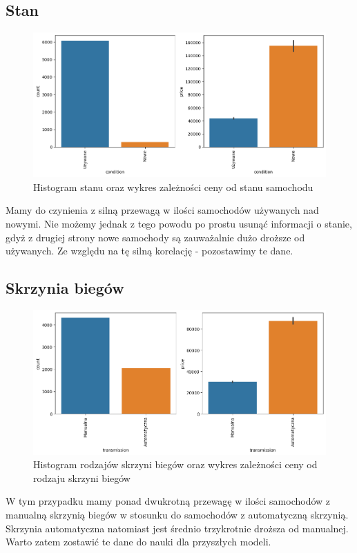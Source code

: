 \documentclass{article}
\begin{document}
\subsection{Stan}
\begin{figure}[H]
    \centering
    \includegraphics[width=1\linewidth]{images/stan.png}
    \caption{Histogram stanu oraz wykres zależności ceny od stanu samochodu}
    \label{plt:condition}
\end{figure}
Mamy do czynienia z silną przewagą w ilości samochodów używanych nad nowymi. Nie możemy jednak z tego powodu po prostu usunąć informacji o stanie, gdyż z drugiej strony nowe samochody są zauważalnie dużo droższe od używanych. Ze względu na tę silną korelację - pozostawimy te dane.

\subsection{Skrzynia biegów}
\begin{figure}[H]
    \centering
    \includegraphics[width=1\linewidth]{images/skrzynia_biegow.png}
    \caption{Histogram rodzajów skrzyni biegów oraz wykres zależności ceny od rodzaju skrzyni biegów}
    \label{plt:transmission}
\end{figure}
W tym przypadku mamy ponad dwukrotną przewagę w ilości samochodów z manualną skrzynią biegów w stosunku do samochodów z automatyczną skrzynią. Skrzynia automatyczna natomiast jest średnio trzykrotnie droższa od manualnej. Warto zatem zostawić te dane do nauki dla przyszłych modeli.
\end{document}
